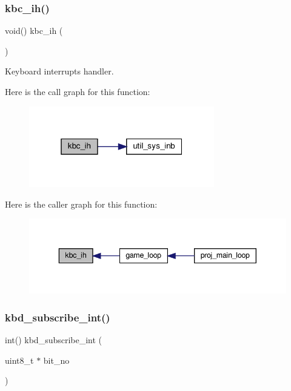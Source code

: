 \subsubsection{\texorpdfstring{kbc\+\_\+ih()}{kbc\_ih()}}
{\footnotesize\ttfamily void() kbc\+\_\+ih (\begin{DoxyParamCaption}{ }\end{DoxyParamCaption})}



Keyboard interrupts handler. 

Here is the call graph for this function\+:
\nopagebreak
\begin{figure}[H]
\begin{center}
\leavevmode
\includegraphics[width=229pt]{group__keyboard_gaea970a154161a35f6894898a092ed70a_cgraph}
\end{center}
\end{figure}
Here is the caller graph for this function\+:
\nopagebreak
\begin{figure}[H]
\begin{center}
\leavevmode
\includegraphics[width=343pt]{group__keyboard_gaea970a154161a35f6894898a092ed70a_icgraph}
\end{center}
\end{figure}
\mbox{\label{group__keyboard_ga4ac9231a99a664d6a9f0b69767e0d707}} 
\subsubsection{\texorpdfstring{kbd\+\_\+subscribe\+\_\+int()}{kbd\_subscribe\_int()}}
{\footnotesize\ttfamily int() kbd\+\_\+subscribe\+\_\+int (\begin{DoxyParamCaption}\item[{uint8\+\_\+t $\ast$}]{bit\+\_\+no }\end{DoxyParamCaption})}



